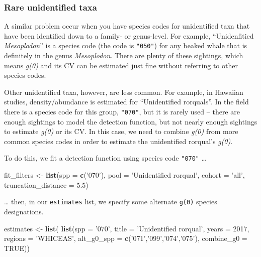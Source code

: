 \documentclass[
]{book}
\newenvironment{Shaded}{\begin{snugshade}}{\end{snugshade}}
\newcommand{\DataTypeTok}[1]{\textcolor[rgb]{0.13,0.29,0.53}{#1}}
\newcommand{\DecValTok}[1]{\textcolor[rgb]{0.00,0.00,0.81}{#1}}
\newcommand{\FloatTok}[1]{\textcolor[rgb]{0.00,0.00,0.81}{#1}}
\newcommand{\KeywordTok}[1]{\textcolor[rgb]{0.13,0.29,0.53}{\textbf{#1}}}
\newcommand{\NormalTok}[1]{#1}
\newcommand{\OtherTok}[1]{\textcolor[rgb]{0.56,0.35,0.01}{#1}}
\newcommand{\StringTok}[1]{\textcolor[rgb]{0.31,0.60,0.02}{#1}}
\begin{document}
\hypertarget{rare-unidentified-taxa}{%
\subsubsection*{Rare unidentified taxa}\label{rare-unidentified-taxa}}

A similar problem occur when you have species codes for unidentified taxa that have been identified down to a family- or genus-level. For example, ``Unidenfitied \emph{Mesoplodon}'' is a species code (the code is \texttt{"050"}) for any beaked whale that is definitely in the genus \emph{Mesoplodon}. There are plenty of these sightings, which means \emph{g(0)} and its CV can be estimated just fine without referring to other species codes.

Other unidentified taxa, however, are less common. For example, in Hawaiian studies, density/abundance is estimated for ``Unidentified rorquals''. In the field there is a species code for this group, \texttt{"070"}, but it is rarely used -- there are enough sightings to model the detection function, but not nearly enough sightings to estimate \emph{g(0)} or its CV. In this case, we need to combine \emph{g(0)} from more common species codes in order to estimate the unidentified rorqual's \emph{g(0)}.

To do this, we fit a detection function using species code \texttt{"070"} \ldots{}

\begin{Shaded}
\begin{Highlighting}[]
\NormalTok{fit_filters <-}
\StringTok{    }\KeywordTok{list}\NormalTok{(}\DataTypeTok{spp =} \KeywordTok{c}\NormalTok{(}\StringTok{'070'}\NormalTok{),}
         \DataTypeTok{pool =} \StringTok{'Unidentified rorqual'}\NormalTok{,}
         \DataTypeTok{cohort =} \StringTok{'all'}\NormalTok{,}
         \DataTypeTok{truncation_distance =} \FloatTok{5.5}\NormalTok{)}
\end{Highlighting}
\end{Shaded}

\ldots{} then, in our \texttt{estimates} list, we specify some alternate \texttt{g(0)} species designations.

\begin{Shaded}
\begin{Highlighting}[]
\NormalTok{estimates <-}\StringTok{ }\KeywordTok{list}\NormalTok{(}
    \KeywordTok{list}\NormalTok{(}\DataTypeTok{spp =} \StringTok{'070'}\NormalTok{,}
         \DataTypeTok{title =} \StringTok{'Unidentified rorqual'}\NormalTok{,}
         \DataTypeTok{years =} \DecValTok{2017}\NormalTok{,}
         \DataTypeTok{regions =} \StringTok{'WHICEAS'}\NormalTok{,}
         \DataTypeTok{alt_g0_spp =} \KeywordTok{c}\NormalTok{(}\StringTok{'071'}\NormalTok{,}\StringTok{'099'}\NormalTok{,}\StringTok{'074'}\NormalTok{,}\StringTok{'075'}\NormalTok{),}
         \DataTypeTok{combine_g0 =} \OtherTok{TRUE}\NormalTok{))}
\end{Highlighting}
\end{Shaded}
\end{document}
